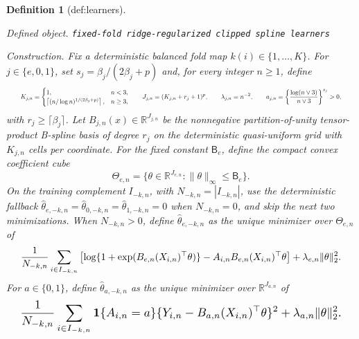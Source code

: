 \documentclass{article}
\newtheorem{definition}{Definition}
\begin{document}
\begin{definition}[def:learners]\label{def:learners}
\par\smallskip\noindent\emph{Defined object.} \texttt{fixed-\allowbreak{}fold ridge-\allowbreak{}regularized clipped spline learners}
\par\smallskip\noindent\emph{Construction.} Fix a deterministic balanced fold map \(k(i)\in\{1,\ldots,K\}\). For \(j\in\{e,0,1\}\), set \(s_j=\beta_j/(2\beta_j+p)\) and, for every integer \(n\ge1\), define
\[
\makebox[\linewidth][c]{\resizebox{0.98\linewidth}{!}{\par\noindent \makebox[\linewidth][c]{\resizebox{0.98\linewidth}{!}{\(\displaystyle \displaystyle K_{j,n}=\begin{cases}1,&n<3,\\ \left\lceil(n/\log n)^{1/(2\beta_j+p)}\right\rceil,&n\ge3,\end{cases}\qquad J_{j,n}=(K_{j,n}+r_j+1)^p,\qquad \lambda_{j,n}=n^{-2},\qquad a_{j,n}=\left\{\frac{\log(n\vee3)}{n\vee3}\right\}^{s_j}>0,\)}}\par\noindent}}
\]
with \(r_j\ge\lceil\beta_j\rceil\). Let \(B_{j,n}(x)\in\mathbb R^{J_{j,n}}\) be the nonnegative partition-of-unity tensor-product B-spline basis of degree \(r_j\) on the deterministic quasi-uniform grid with \(K_{j,n}\) cells per coordinate. For the fixed constant \(\mathsf B_e\), define the compact convex coefficient cube
\[\Theta_{e,n}=\{\theta\in\mathbb R^{J_{e,n}}:\lVert\theta\rVert_\infty\le\mathsf B_e\}.\]
On the training complement \(I_{-k,n}\), with \(N_{-k,n}=|I_{-k,n}|\), use the deterministic fallback \(\widehat\theta_{e,-k,n}=\widehat\theta_{0,-k,n}=\widehat\theta_{1,-k,n}=0\) when \(N_{-k,n}=0\), and skip the next two minimizations. When \(N_{-k,n}>0\), define \(\widehat\theta_{e,-k,n}\) as the unique minimizer over \(\Theta_{e,n}\) of
\[
\makebox[\linewidth][c]{\resizebox{0.98\linewidth}{!}{\par\noindent \makebox[\linewidth][c]{\resizebox{0.98\linewidth}{!}{\(\displaystyle \displaystyle \frac1{N_{-k,n}}\sum_{i\in I_{-k,n}}\left[\log\{1+\exp(B_{e,n}(X_{i,n})^\top\theta)\}-A_{i,n}B_{e,n}(X_{i,n})^\top\theta\right]+\lambda_{e,n}\lVert\theta\rVert_2^2.\)}}\par\noindent}}
\]
For \(a\in\{0,1\}\), define \(\widehat\theta_{a,-k,n}\) as the unique minimizer over \(\mathbb R^{J_{a,n}}\) of
\[
\makebox[\linewidth][c]{\resizebox{0.98\linewidth}{!}{\par\noindent \makebox[\linewidth][c]{\resizebox{0.98\linewidth}{!}{\(\displaystyle \displaystyle \frac1{N_{-k,n}}\sum_{i\in I_{-k,n}}\mathbf 1\{A_{i,n}=a\}\{Y_{i,n}-B_{a,n}(X_{i,n})^\top\theta\}^2+\lambda_{a,n}\lVert\theta\rVert_2^2.\)}}\par\noindent}}
\]
\end{definition}
\end{document}

